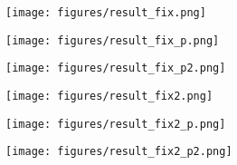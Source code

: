 \documentclass[12pt, a4paper]{article}
\begin{document}
\begin{figure}[t] %
\centering
\begin{subfigure}{.3\textwidth}
	\centering %
	\texttt{[image: figures/result\_fix.png]} %
	\caption{} %
	\label{fig:fix} %
\end{subfigure}
\begin{subfigure}{.3\textwidth}
	\centering
	\texttt{[image: figures/result\_fix\_p.png]} %
	\caption{} %
	\label{fig:fix_p} %
\end{subfigure}
\begin{subfigure}{.3\textwidth}
	\centering
	\texttt{[image: figures/result\_fix\_p2.png]} %
	\caption{} %
	\label{fig:fix_p2} %
\end{subfigure}


\begin{subfigure}{.3\textwidth}
	\centering %
	\texttt{[image: figures/result\_fix2.png]} %
	\caption{} %
	\label{fig:fix2} %
\end{subfigure}
\begin{subfigure}{.3\textwidth}
	\centering
	\texttt{[image: figures/result\_fix2\_p.png]} %
	\caption{} %
	\label{fig:fix2_p} %
\end{subfigure}
\begin{subfigure}{.3\textwidth}
	\centering
	\texttt{[image: figures/result\_fix2\_p2.png]} %
	\caption{} %
	\label{fig:fix2_p2} %
\end{subfigure}


\end{figure}
\end{document}
